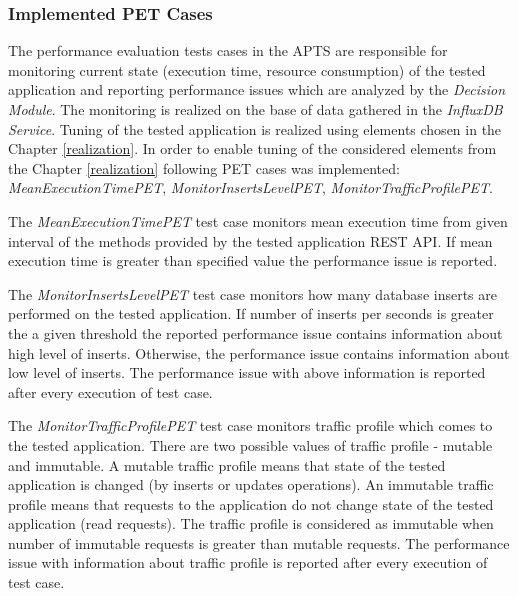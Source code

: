 \documentclass[12pt,a4paper]{article}
\begin{document}
\subsubsection{Implemented PET Cases} \label{dm}

 The performance evaluation tests cases in the APTS are responsible for monitoring current state (execution time, resource consumption) of the tested application and reporting performance issues which are analyzed by the \textit{Decision Module}. The monitoring is realized on the base of data gathered in the \textit{InfluxDB Service}.  Tuning of the tested application is realized using elements chosen in the Chapter \ref{realization}. In order to enable tuning of the considered elements from the Chapter \ref{realization} following PET cases was implemented: \textit{MeanExecutionTimePET}, \textit{MonitorInsertsLevelPET},  \textit{MonitorTrafficProfilePET}.
 
 The \textit{MeanExecutionTimePET} test case monitors mean execution time from given interval of the methods provided by the tested application REST API. If mean execution time is greater than specified value the performance issue is reported. 

The \textit{MonitorInsertsLevelPET} test case monitors how many database inserts are performed on the tested application. If number of inserts per seconds is greater the a given threshold the reported performance issue contains information about high level of inserts. Otherwise, the performance issue contains information about low level of inserts. The performance issue with above information is reported after every execution of test case. 

The \textit{MonitorTrafficProfilePET} test case monitors traffic profile which comes to the tested application. There are two possible values of traffic profile - mutable and immutable. A mutable traffic profile means that state of the tested application is changed (by inserts or updates operations). An immutable traffic profile means that requests to the application do not change state of the tested application (read requests). The traffic profile is considered as immutable when number of immutable requests is greater than mutable requests. The performance issue with information about traffic profile is reported after every execution of test case.
\end{document}
